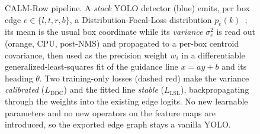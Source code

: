 \begin{figure}[!t]
{}
  \caption{CALM-Row pipeline. A \emph{stock} YOLO detector (blue) emits, per box edge $e\in\{l,t,r,b\}$,
  a Distribution-Focal-Loss distribution $p_e(k)$~\cite{gfl}; its mean is the usual box coordinate while
  its \emph{variance} $\sigma_e^2$ is read out (orange, CPU, post-NMS) and propagated to a per-box centroid
  covariance, then used as the precision weight $w_i$ in a differentiable generalized-least-squares fit of the
  guidance line $x=ay+b$ and its heading $\theta$. Two training-only losses (dashed red) make the variance
  \emph{calibrated} ($L_\mathrm{DDC}$) and the fitted line \emph{stable} ($L_\mathrm{LSL}$), backpropagating
  through the weights into the existing edge logits. No new learnable parameters and no new operators on the
  feature maps are introduced, so the exported edge graph stays a vanilla YOLO.}
  \label{fig:pipeline}
\end{figure}
